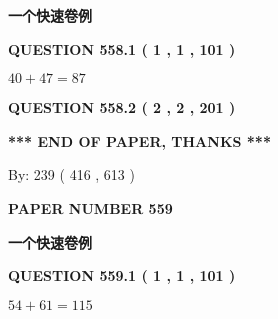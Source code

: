 \documentclass{ctexart}
\begin{document}
   
   
   
 \vspace{0.2in}
{\LARGE {\textbf{ 一个快速卷例}}}
   
   
  
\vspace{0.2in}
  
{\textbf{\Large{QUESTION
558.1 
 ( 1 , 1 , 101 )
}}}
  
  
 
 

$ %
40 +  %
47=   %
87$
 
 
  
\vspace{0.2in}
  
{\textbf{\Large{QUESTION
558.2 
 ( 2 , 2 , 201 )
}}}
  
  
   
   
 \vspace{0.2in}
 
   
   
   
   
\vspace{1.0in} 
{\textbf{\large{ *** END OF PAPER, THANKS *** }}} 
   
   
\hspace{1.0in} By: 
 239 ( 416 ,  613 )
   
   
   
   
\newpage 
\setcounter{page}{ 
   559001 } 
   
   
   
   
 {\textbf{ \Large{ PAPER NUMBER  559  }}}
   
   
\vspace{0.2in}
   
   
   
   
   
   
 \vspace{0.2in}
{\LARGE {\textbf{ 一个快速卷例}}}
   
   
  
\vspace{0.2in}
  
{\textbf{\Large{QUESTION
559.1 
 ( 1 , 1 , 101 )
}}}
  
  
 
 

$ %
54 +  %
61=   %
115$
 
 
  
\vspace{0.2in}
  
\end{document}
